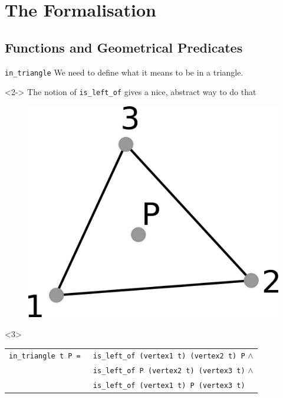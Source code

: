 \documentclass[18pt]{beamer}
\begin{document}
\section{The Formalisation}


\subsection{Functions and Geometrical Predicates}



\begin{frame}{\tt in\_triangle}
 We need to define what it means to be in a triangle.

\begin{minipage}{.6\textwidth}
\begin{uncoverenv}<2->
   The notion of {\tt is\_left\_of} gives a nice, abstract way to do that
 \end{uncoverenv}
   \end{minipage}%
  \begin{minipage}{.4\textwidth}
  \begin{overprint}

        \begin{figure}
  	\centering
 	\includegraphics{intriangle}
      \end{figure}
  \end{overprint}
\end{minipage}
\begin{uncoverenv}<3>
 
 {\small \begin{tabular}{ll}
       {\tt in\_triangle t P = }& {\tt is\_left\_of (vertex1 t) (vertex2 t) P} $\wedge$\\
        &{\tt is\_left\_of P (vertex2 t) (vertex3 t)} $\wedge$\\
  & {\tt is\_left\_of (vertex1 t) P (vertex3 t)}
      \end{tabular}}

\end{uncoverenv}
\end{frame}
\end{document}
